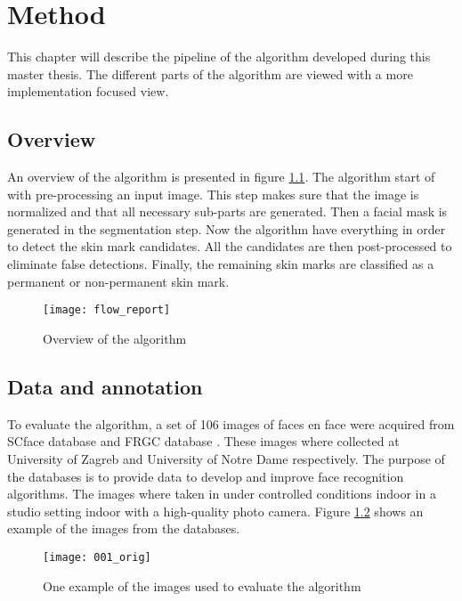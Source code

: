 \chapter{Method}\label{cha:method}

This chapter will describe the pipeline of the algorithm developed during this master thesis. The different parts of the algorithm are viewed with a more implementation focused view.

\section{Overview}

An overview of the algorithm is presented in figure \ref{fig:detection_flow}. The algorithm start of with pre-processing an input image. This step makes sure that the image is normalized and that all necessary sub-parts are generated. Then a facial mask is generated in the segmentation step. Now the algorithm have everything in order to detect the skin mark candidates. All the candidates are then post-processed to eliminate false detections. Finally, the remaining skin marks are classified as a permanent or non-permanent skin mark.    

\FloatBarrier
 \begin{figure}[h]
 	\centering
 	\texttt{[image: flow\_report]}
 	\caption{Overview of the algorithm \label{fig:detection_flow}}
 \end{figure}
\FloatBarrier

\section{Data and annotation}

To evaluate the algorithm, a set of 106 images of faces en face were acquired from SCface database \cite{SCface} and FRGC database \cite{FRGC}. These images where collected at University of Zagreb and University of Notre Dame respectively. The purpose of the databases is to provide data to develop and improve face recognition algorithms. The images where taken in under controlled conditions indoor in a studio setting indoor with a high-quality photo camera. Figure \ref{fig:orig_img} shows an example of the images from the databases.

\FloatBarrier
\begin{figure}[h]
	\centering
	\texttt{[image: 001\_orig]}
	\caption{One example of the images used to evaluate the algorithm \label{fig:orig_img}}
\end{figure}
\FloatBarrier

